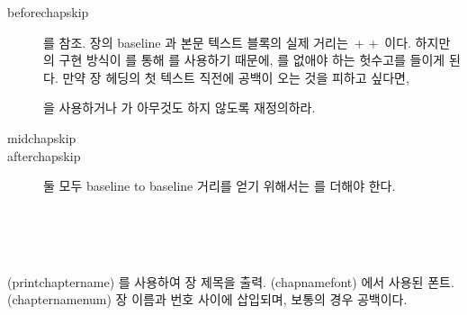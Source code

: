 \begin{description}

\item[beforechapskip] 를 참조. 
장의 baseline 과 본문 텍스트 블록의 실제 거리는 
\cmd{\beforechapskip}\,+\,\cmd{\topskip}\,+\,\cmd{\baselineskip} 이다.
하지만 \cmd{\chapter}의 구현 방식이 
\cmd{\chapterheadstart}를 통해 \cmd{\vspace*}를 사용하기 때문에,
\cmd{\beforechapskip} 를 없애야 하는 헛수고를 들이게 된다.
만약 장 헤딩의 첫 텍스트 직전에 공백이 오는 것을 피하고 싶다면,
\begin{lcode}
	\setlength\beforechapskip{-\baselineskip}
\end{lcode}
을 사용하거나 \cmd{\chapterheadstart}가 아무것도 하지 않도록 재정의하라.


\item[midchapskip] 
\item[afterchapskip] 
둘 모두 baseline to baseline 거리를 얻기 위해서는 \cmd{\baselineskip}를 더해야 한다.

\end{description}
\endgroup





\begin{syntax}
\cmd{\printchaptername} \cmd{\chapnamefont} \\
\cmd{\chapternamenum} \\
\cmd{\printchapternum} \cmd{\chapnumfont} \\
\end{syntax}
\glossary(printchaptername)%
  {}%
  {를 사용하여 장 제목을 출력.}
\glossary(chapnamefont)%
  {}%
  {에서 사용된 폰트.}
\glossary(chapternamenum)%
  {}%
  {장 이름과 번호 사이에 삽입되며, 보통의 경우 공백이다.}

